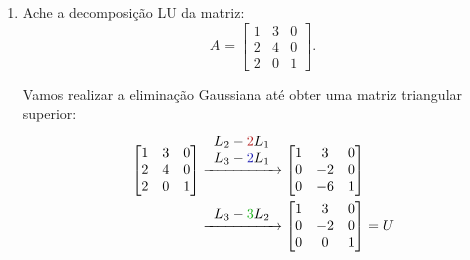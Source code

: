 \documentclass[leqno]{article}
\numberwithin{equation}{section}
\begin{document}
\maketitle

\begin{enumerate}

    \item Ache a decomposição LU da matriz:
        $$A =
        \begin{bmatrix}
            1 & 3 & 0  \\
            2 & 4 & 0  \\
            2 & 0 & 1 
        \end{bmatrix}.
        $$

        \begin{sol} 
            Vamos realizar a eliminação Gaussiana até obter uma matriz triangular superior:
            \begin{align*}
                \begin{bmatrix}
                    1 & 3 & 0  \\
                    2 & 4 & 0  \\
                    2 & 0 & 1 
                \end{bmatrix}
                &\xrightarrow{
                    \begin{array}{l}
                        L_{ 2 } - {\color{myred} 2} L_{ 1 } \\
                        L_{ 3 } - {\color{myblue} 2} L_{ 1 }
                    \end{array}
                }
                \begin{bmatrix}
                    1 & 3 & 0  \\
                    0 & -2 & 0  \\
                    0 & -6 & 1 
                \end{bmatrix} \\
                &\xrightarrow{
                    \begin{array}{l}
                        L_{ 3 } - {\color{mygreen} 3} L_{ 2 }
                    \end{array}
                }
                \begin{bmatrix}
                    1 & 3 & 0  \\
                    0 & -2 & 0  \\
                    0 & 0 & 1 
                \end{bmatrix}
                = U

\end{align*}
\end{sol}
\end{enumerate}
\end{document}
